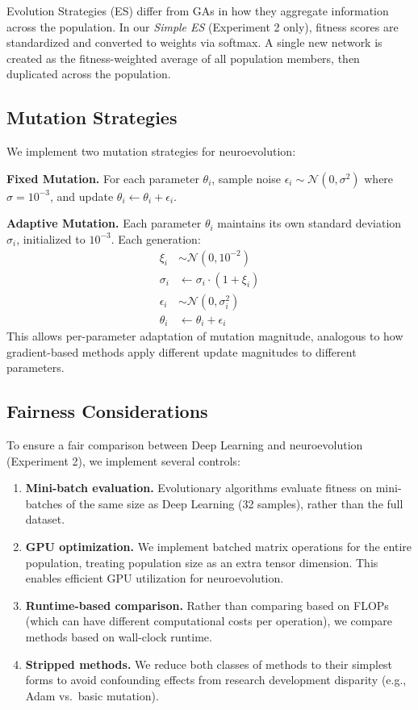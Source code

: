 \documentclass{article}
\begin{document}
Evolution Strategies (ES) differ from GAs in how they aggregate information across the population. In our \textit{Simple ES} (Experiment 2 only), fitness scores are standardized and converted to weights via softmax. A single new network is created as the fitness-weighted average of all population members, then duplicated across the population.

\subsection{Mutation Strategies}

We implement two mutation strategies for neuroevolution:

\textbf{Fixed Mutation.} For each parameter $\theta_i$, sample noise $\epsilon_i \sim \mathcal{N}(0, \sigma^2)$ where $\sigma = 10^{-3}$, and update $\theta_i \leftarrow \theta_i + \epsilon_i$.

\textbf{Adaptive Mutation.} Each parameter $\theta_i$ maintains its own standard deviation $\sigma_i$, initialized to $10^{-3}$. Each generation:
\begin{align}
    \xi_i &\sim \mathcal{N}(0, 10^{-2}) \\
    \sigma_i &\leftarrow \sigma_i \cdot (1 + \xi_i) \\
    \epsilon_i &\sim \mathcal{N}(0, \sigma_i^2) \\
    \theta_i &\leftarrow \theta_i + \epsilon_i
\end{align}
This allows per-parameter adaptation of mutation magnitude, analogous to how gradient-based methods apply different update magnitudes to different parameters.

\subsection{Fairness Considerations}

To ensure a fair comparison between Deep Learning and neuroevolution (Experiment 2), we implement several controls:

\begin{enumerate}
    \item \textbf{Mini-batch evaluation.} Evolutionary algorithms evaluate fitness on mini-batches of the same size as Deep Learning (32 samples), rather than the full dataset.

    \item \textbf{GPU optimization.} We implement batched matrix operations for the entire population, treating population size as an extra tensor dimension. This enables efficient GPU utilization for neuroevolution.

    \item \textbf{Runtime-based comparison.} Rather than comparing based on FLOPs (which can have different computational costs per operation), we compare methods based on wall-clock runtime.

    \item \textbf{Stripped methods.} We reduce both classes of methods to their simplest forms to avoid confounding effects from research development disparity (e.g., Adam vs.\ basic mutation).
\end{enumerate}
\end{document}
